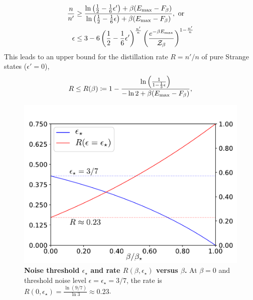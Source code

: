 \documentclass[pra,
aps,
twocolumn,
superscriptaddress,
groupedaddress,
nofootinbib,
reprint
]{revtex4-1}
\begin{document}
\begin{enumerate}
\begin{align}
	\frac{n}{n'} &\geq \frac{\ln{\big( \frac{1}{2}-\frac{1}{6}\epsilon' \big)} + \beta (E_{\rm{max}} - F_\beta)}{\ln{\big( \frac{1}{2}-\frac{1}{6}\epsilon \big)} + \beta (E_{\rm{max}} - F_\beta)}, \text{ or} \\
	\epsilon &\leq 3 - 6 \left( \frac{1}{2} - \frac{1}{6}\epsilon' \right)^{\frac{n'}{n}} \left( \frac{e^{-\beta E_{\rm{max}}}}{\mathcal{Z}_\beta} \right)^{1 - \frac{n'}{n}}	
\end{align}
This leads to an upper bound for the distillation rate $R=n'/n$ of pure Strange states ($\epsilon' = 0$),
\begin{equation}
	R \leq R(\beta) \coloneqq 1 - \frac{\ln{\left(\frac{1}{1-\frac{1}{3}\epsilon} \right)}}{-\ln{2} + \beta (E_{\rm{max}} - F_\beta)},
\end{equation}
\end{enumerate}

\begin{figure}[h]
    \centering
    \includegraphics[scale=0.5]{figs/noise_threshold.pdf}
    \caption{\textbf{Noise threshold $\epsilon_\star$ and rate $R(\beta, \epsilon_\star)$ versus $\beta$.}
    At $\beta = 0$ and threshold noise level $\epsilon = \epsilon_\star = 3/7$, the rate is $R(0, \epsilon_\star) = \frac{\ln{(9/7)}}{\ln{3}} \approx 0.23$.
    }
    \label{fig:noise_threshold}
\end{figure}
\end{document}
